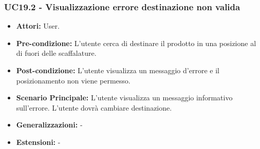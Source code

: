 \subsubsection{UC19.2 - Visualizzazione errore destinazione non valida}
\begin{itemize}
    \item \textbf{Attori:} User.
    \item \textbf{Pre-condizione:}  L'utente cerca di destinare il prodotto in una posizione al di fuori delle scaffalature.
    \item \textbf{Post-condizione:} L'utente visualizza un messaggio d'errore e il posizionamento non viene permesso.
    \item \textbf{Scenario Principale:} L'utente visualizza un messaggio informativo sull'errore. L'utente dovrà cambiare destinazione.
    \item \textbf{Generalizzazioni:} -
    \item \textbf{Estensioni:} -
\end{itemize}